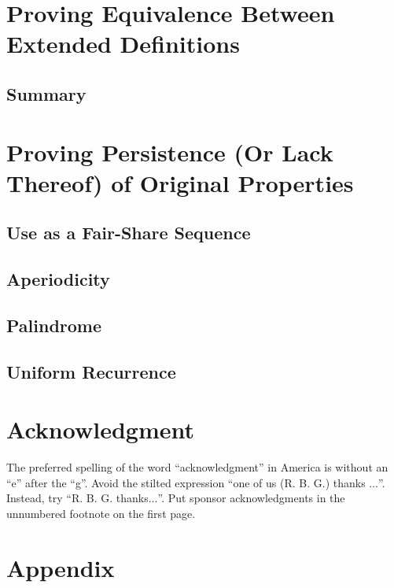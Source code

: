 \documentclass[conference]{IEEEtran}
\begin{document}
\section{Proving Equivalence Between Extended Definitions}

\subsection{Summary}

\section{Proving Persistence (Or Lack Thereof) of Original Properties}

\subsection{Use as a Fair-Share Sequence}

\subsection{Aperiodicity}

\subsection{Palindrome}

\subsection{Uniform Recurrence}


\section{Acknowledgment}

The preferred spelling of the word ``acknowledgment'' in America is without 
an ``e'' after the ``g''. Avoid the stilted expression ``one of us (R. B. 
G.) thanks $\ldots$''. Instead, try ``R. B. G. thanks$\ldots$''. Put sponsor 
acknowledgments in the unnumbered footnote on the first page.

\section{Appendix}
\end{document}
